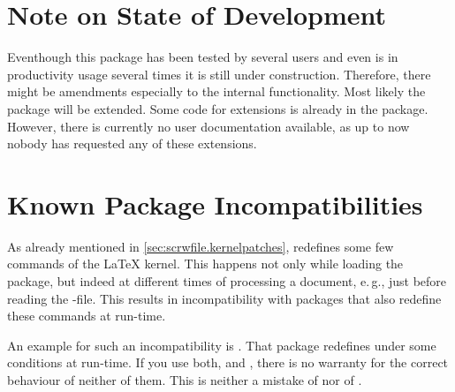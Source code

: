 \section{Note on State of Development}
\label{sec:scrwfile.draft}

Eventhough this package has been tested by several users and even is in
productivity usage several times it is still under construction. Therefore,
there might be amendments especially to the internal functionality. Most likely
the package will be extended. Some code for extensions is already in the
package. However, there is currently no user documentation available, as up to
now nobody has requested any of these extensions.

\section{Known Package Incompatibilities}
\label{sec:scrwfile.incompatible}

As already mentioned in \autoref{sec:scrwfile.kernelpatches},
 redefines some few commands of the \LaTeX{} kernel. This
happens not only while loading the package, but indeed at different times of
processing a document, e.\,g., just before reading the
-file. This results in incompatibility with
packages that also redefine these commands at run-time.

An example for such an incompatibility is
. That
package redefines  under some conditions at run-time. If you
use both,  and , there is no warranty for
the correct behaviour of neither of them. This is neither a mistake of
 nor of .



